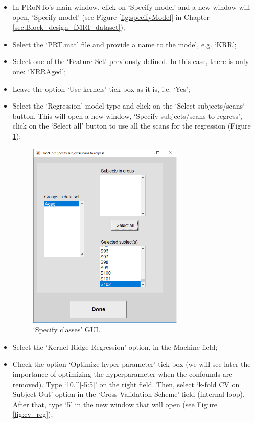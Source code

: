 \begin{itemize}
	
	\item In PRoNTo's main window, click on `Specify model' and a new window will open, `Specify model' (see Figure \ref{fig:specifyModel} in Chapter \ref{sec:Block_design_fMRI_dataset});

	\item Select the `PRT.mat' file and provide a name to the model, e.g. `KRR';
	
	\item Select one of the `Feature Set' previously defined. In this case, there is only one:  `KRRAged';
	
	\item Leave the option `Use kernels' tick box as it is, i.e. `Yes';

	\item Select the `Regression' model type and click on the `Select subjects/scans` button. This will open a new window, `Specify subjects/scans to regress', click on the `Select all' button to use all the scans for the regression  (Figure \ref{fig:specifySubjects_reg});

	
\begin{figure}[!h]
	\centering
		\includegraphics[height=9cm]{images/Tutorial/confounds/specify_subjects.png}
	\caption{`Specify classes' GUI.}
	\label{fig:specifySubjects_reg}
\end{figure}
	
	\item Select the `Kernel Ridge Regression' option, in the Machine field;	
	
	 \item Check the option `Optimize hyper-parameter' tick box (we will see later the importance of optimizing the hyperparameter when the confounds are removed). Type `10.\textasciicircum{}[-5:5]' on the right field. Then, select `k-fold CV on Subject-Out' option in the `Cross-Validation Scheme' field (internal loop). After that, type `5' in the new window that will open (see Figure \ref{fig:cv_reg});
	

\end{itemize}
